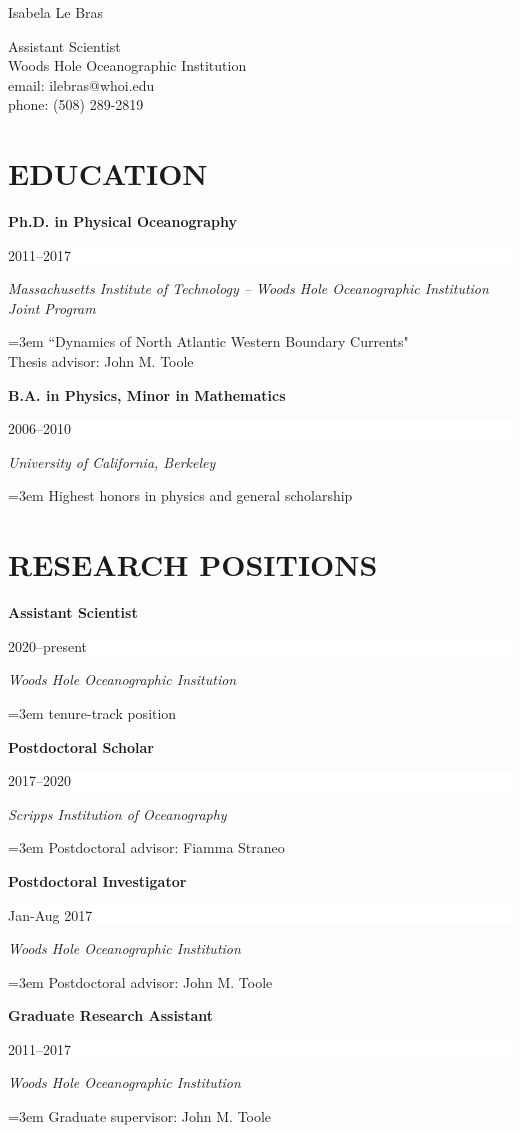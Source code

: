 \documentclass[paper=letter,fontsize=11pt]{scrartcl} %
\newcommand{\sepspace}{\vspace*{3mm}}		%
\newcommand{\MyName}[1]{ %
		\huge  \textbf \hfill #1 %
		\par \normalsize \normalfont}
\newcommand{\MySlogan}[1]{ %
		\large \hfill #1 %
		\par \normalsize \normalfont}
\newcommand{\NewPart}[2]{\section*{\uppercase{#1} #2}}
\newcommand{\EducationEntry}[4]{
		\noindent \textbf{#1} \hfill      %
		\colorbox{White}{%
			\parbox{8em}{%
			\hfill\color{Black}#2}} \par  %
		\noindent \textit{#3} \par        %
		\noindent\hangindent=3em\hangafter=0 #4 %
		 \par}
\begin{document}


\MyName{Isabela Le Bras}
\MySlogan{\vspace{-0.3in}\begin{flushright}Assistant Scientist\\
Woods Hole Oceanographic Institution\\
email: ilebras@whoi.edu\\
phone: (508) 289-2819\\
\end{flushright}}


\NewPart{Education}{}

\EducationEntry{Ph.D. in Physical Oceanography}{2011--2017}{Massachusetts Institute of Technology -- Woods Hole Oceanographic Institution Joint Program}{``Dynamics of North Atlantic Western Boundary Currents"\\
Thesis advisor: John M. Toole}
\sepspace

\EducationEntry{B.A. in Physics, Minor in Mathematics}{2006--2010}{University of California, Berkeley}{Highest honors in physics and general scholarship}

\NewPart{Research Positions}{}

\EducationEntry{{Assistant Scientist}}{2020--present}{Woods Hole Oceanographic Insitution}{tenure-track position}

\sepspace

\EducationEntry{{Postdoctoral Scholar}}{2017--2020}{Scripps Institution of Oceanography}{Postdoctoral advisor: Fiamma Straneo}

\sepspace

\EducationEntry{Postdoctoral Investigator}{Jan-Aug 2017}{Woods Hole Oceanographic Institution}
{Postdoctoral advisor: John M. Toole}

\sepspace

\EducationEntry{Graduate Research Assistant}{2011--2017}{Woods Hole Oceanographic Institution}
{Graduate supervisor: John M. Toole}

\end{document}
